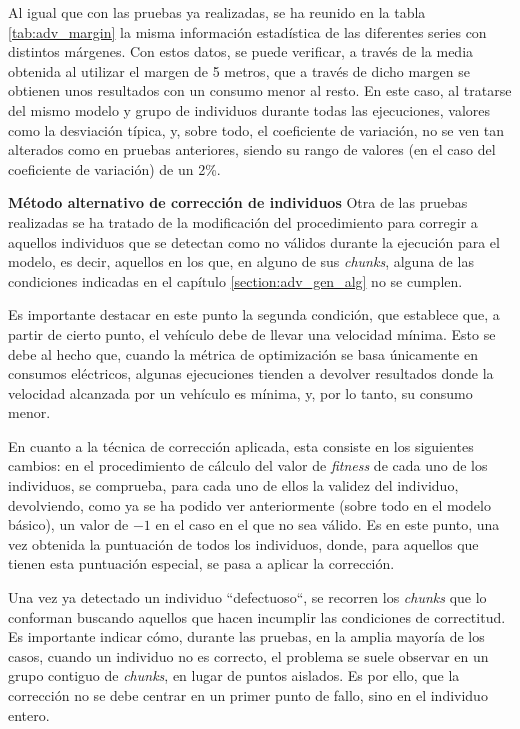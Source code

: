 \documentclass[11pt,spanish,listoffigures,listoftables]{tfgetsinf}
\begin{document}
Al igual que con las pruebas ya realizadas, se ha reunido en la tabla \ref{tab:adv_margin} la misma información estadística de las diferentes series con distintos márgenes. Con estos datos, se puede verificar, a través de la media obtenida al utilizar el margen de 5 metros, que a través de dicho margen se obtienen unos resultados con un consumo menor al resto. En este caso, al tratarse del mismo modelo y grupo de individuos durante todas las ejecuciones, valores como la desviación típica, y, sobre todo, el coeficiente de variación, no se ven tan alterados como en pruebas anteriores, siendo su rango de valores (en el caso del coeficiente de variación) de un 2\%.\newline

\textbf{Método alternativo de corrección de individuos}\newline
Otra de las pruebas realizadas se ha tratado de la modificación del procedimiento para corregir a aquellos individuos que se detectan como no válidos durante la ejecución para el modelo, es decir, aquellos en los que, en alguno de sus \textit{chunks}, alguna de las  condiciones indicadas en el capítulo \ref{section:adv_gen_alg} no se cumplen.

Es importante destacar en este punto la segunda condición, que establece que, a partir de cierto punto, el vehículo debe de llevar una velocidad mínima. Esto se debe al hecho que, cuando la métrica de optimización se basa únicamente en consumos eléctricos, algunas ejecuciones tienden a devolver resultados donde la velocidad alcanzada por un vehículo es mínima, y, por lo tanto, su consumo menor.

En cuanto a la técnica de corrección aplicada, esta consiste en los siguientes cambios: en el procedimiento de cálculo del valor de \textit{fitness} de cada uno de los individuos, se comprueba, para cada uno de ellos la validez del individuo, devolviendo, como ya se ha podido ver anteriormente (sobre todo en el modelo básico), un valor de $-1$ en el caso en el que no sea válido. Es en este punto, una vez obtenida la puntuación de todos los individuos, donde, para aquellos que tienen esta puntuación especial, se pasa a aplicar la corrección.

Una vez ya detectado un individuo ``defectuoso``, se recorren los \textit{chunks} que lo conforman buscando aquellos que hacen incumplir las condiciones de correctitud. Es importante indicar cómo, durante las pruebas, en la amplia mayoría de los casos, cuando un individuo no es correcto, el problema se suele observar en un grupo contiguo de \textit{chunks}, en lugar de puntos aislados. Es por ello, que la corrección no se debe centrar en un primer punto de fallo, sino en el individuo entero.
\end{document}

